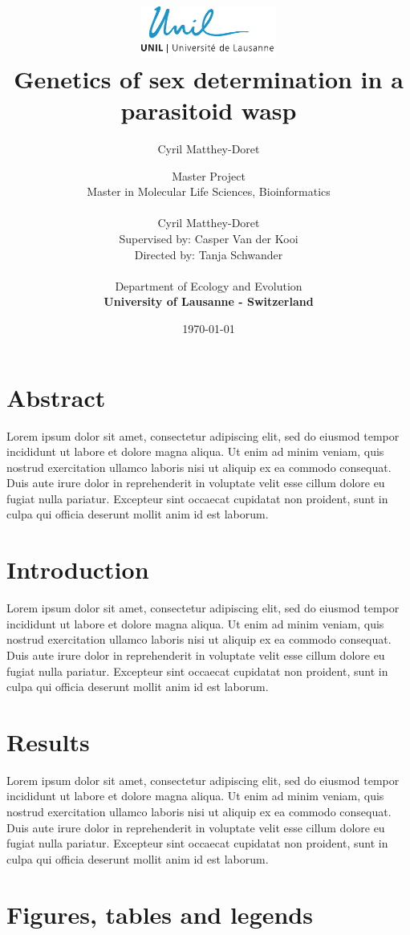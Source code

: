 \documentclass[11pt,a4paper]{report}
\author{Cyril Matthey-Doret}
\title{
\includegraphics[width=1.75in]{lo_unil06_bleu.pdf} \\
\vspace*{1in}
\textbf{Genetics of sex determination in a parasitoid wasp}}
\author{\Large{Master Project}\\
		Master in Molecular Life Sciences, Bioinformatics\\
				\vspace*{0.5in} \\
		Cyril Matthey-Doret\\
        Supervised by: Casper Van der Kooi\\
        Directed by: Tanja Schwander\\
		\vspace*{0.5in} \\
		Department of Ecology and Evolution\\
        \textbf{University of Lausanne - Switzerland}\\
       } \date{\today}
\begin{document}
\renewcommand{\headrulewidth}{1pt}
\maketitle

\section*{Abstract}
Lorem ipsum dolor sit amet, consectetur adipiscing elit, sed do eiusmod tempor incididunt ut labore et dolore magna aliqua. Ut enim ad minim veniam, quis nostrud exercitation ullamco laboris nisi ut aliquip ex ea commodo consequat. Duis aute irure dolor in reprehenderit in voluptate velit esse cillum dolore eu fugiat nulla pariatur. Excepteur sint occaecat cupidatat non proident, sunt in culpa qui officia deserunt mollit anim id est laborum.

\section*{Introduction}

Lorem ipsum dolor sit amet, consectetur adipiscing elit, sed do eiusmod tempor incididunt ut labore et dolore magna aliqua. Ut enim ad minim veniam, quis nostrud exercitation ullamco laboris nisi ut aliquip ex ea commodo consequat. Duis aute irure dolor in reprehenderit in voluptate velit esse cillum dolore eu fugiat nulla pariatur. Excepteur sint occaecat cupidatat non proident, sunt in culpa qui officia deserunt mollit anim id est laborum.

\section*{Results}

Lorem ipsum dolor sit amet, consectetur adipiscing elit, sed do eiusmod tempor incididunt ut labore et dolore magna aliqua. Ut enim ad minim veniam, quis nostrud exercitation ullamco laboris nisi ut aliquip ex ea commodo consequat. Duis aute irure dolor in reprehenderit in voluptate velit esse cillum dolore eu fugiat nulla pariatur. Excepteur sint occaecat cupidatat non proident, sunt in culpa qui officia deserunt mollit anim id est laborum.

\section*{Figures, tables and legends}
\end{document}

